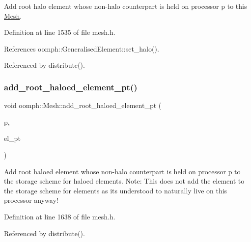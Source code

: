 Add root halo element whose non-\/halo counterpart is held on processor p to this \hyperlink{classoomph_1_1Mesh}{Mesh}. 



Definition at line 1535 of file mesh.\+h.



References oomph\+::\+Generalised\+Element\+::set\+\_\+halo().



Referenced by distribute().

\mbox{\label{classoomph_1_1Mesh_a5ad406db29df11b70df0f497817cc24f}} 
\subsubsection{\texorpdfstring{add\+\_\+root\+\_\+haloed\+\_\+element\+\_\+pt()}{add\_root\_haloed\_element\_pt()}}
{\footnotesize\ttfamily void oomph\+::\+Mesh\+::add\+\_\+root\+\_\+haloed\+\_\+element\+\_\+pt (\begin{DoxyParamCaption}\item[{const unsigned \&}]{p,  }\item[{\hyperlink{classoomph_1_1GeneralisedElement}{Generalised\+Element} $\ast$\&}]{el\+\_\+pt }\end{DoxyParamCaption})\hspace{0.3cm}{\ttfamily [inline]}}



Add root haloed element whose non-\/halo counterpart is held on processor p to the storage scheme for haloed elements. Note\+: This does not add the element to the storage scheme for elements as it\textquotesingle{}s understood to naturally live on this processor anyway! 



Definition at line 1638 of file mesh.\+h.



Referenced by distribute().

\mbox{\label{classoomph_1_1Mesh_a3b81e17514396174f857d412a8c6abd7}} 
